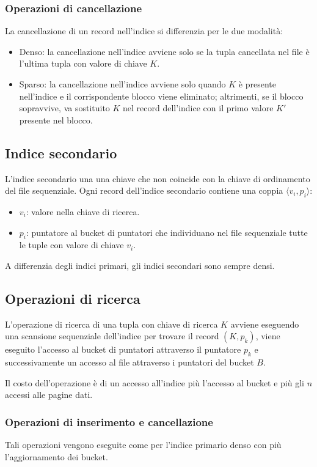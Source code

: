 \documentclass[oneside,a4paper,11pt]{book}
\theoremstyle{italicstyle}
\theoremstyle{normStyle}
\begin{document}
\subsubsection{Operazioni di cancellazione}
La cancellazione di un record nell'indice si differenzia per le due modalità:
\begin{itemize}
    \item Denso: la cancellazione nell'indice avviene solo se la tupla cancellata 
    nel file è l'ultima tupla con valore di chiave $K$.
    \item Sparso: la cancellazione nell'indice avviene solo quando $K$ è presente 
    nell'indice e il corrispondente blocco viene eliminato; altrimenti, se il 
    blocco sopravvive, va sostituito $K$ nel record dell'indice con il primo valore 
    $K'$ presente nel blocco.
\end{itemize}
\subsection{Indice secondario}
L'indice secondario una una chiave che non coincide con la chiave di ordinamento del file 
sequenziale. Ogni record dell'indice secondario contiene una coppia $\langle v_i,p_i\rangle$:
\begin{itemize}
    \item $v_i$: valore nella chiave di ricerca.
    \item $p_i$: puntatore al bucket di puntatori che individuano nel file 
    sequenziale tutte le tuple con valore di chiave $v_i$.
\end{itemize}
A differenzia degli indici primari, gli indici secondari sono sempre densi.
\subsection{Operazioni di ricerca}
L'operazione di ricerca di una tupla con chiave di ricerca $K$ avviene eseguendo 
una scansione sequenziale dell'indice per trovare il record $(K,p_k)$, viene eseguito 
l'accesso al bucket di puntatori attraverso il puntatore $p_k$ e successivamente un accesso al file 
attraverso i puntatori del bucket $B$.

Il costo dell'operazione è di un accesso all'indice più l'accesso al bucket e più 
gli $n$ accessi alle pagine dati.
\subsubsection{Operazioni di inserimento e cancellazione}
Tali operazioni vengono eseguite come per l'indice primario denso con più 
l'aggiornamento dei bucket.
\end{document}
